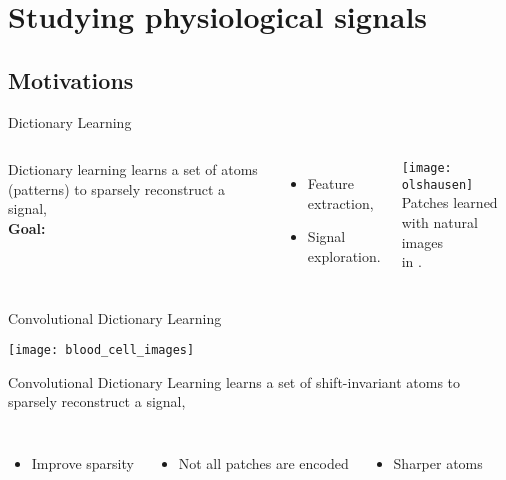 \documentclass[prez_tpt]{subfiles}
\begin{document}
\section{Studying physiological signals}
\subsection{Motivations}
%
\begin{frame}{Dictionary Learning }
\begin{columns}[c]
        Dictionary learning learns a set of atoms (patterns) to sparsely
        reconstruct a signal,\\[2em]
        \textbf{Goal:}\\[1em]
        \begin{itemize}\itemsep1em
            \item Feature extraction,
            \item Signal exploration.
        \end{itemize}
    \centering
    \texttt{[image: olshausen]}\\[.5em]
    Patches learned with natural images\\ in \citealt{Olshausen1997}.
\end{columns}
\end{frame}

\begin{frame}{Convolutional Dictionary Learning }

{\centering \texttt{[image: blood\_cell\_images]}\\[.5em]}

{\color{red} Convolutional} Dictionary Learning learns a set of {\color{red} shift-invariant} atoms to sparsely reconstruct a signal,
\begin{columns}[T]
    \begin{itemize}
        \item Improve sparsity
    \end{itemize}
    \begin{itemize}
        \item Not all patches are encoded
    \end{itemize}
    \begin{itemize}
        \item Sharper atoms
    \end{itemize}
\end{columns}
\end{frame}
\end{document}
